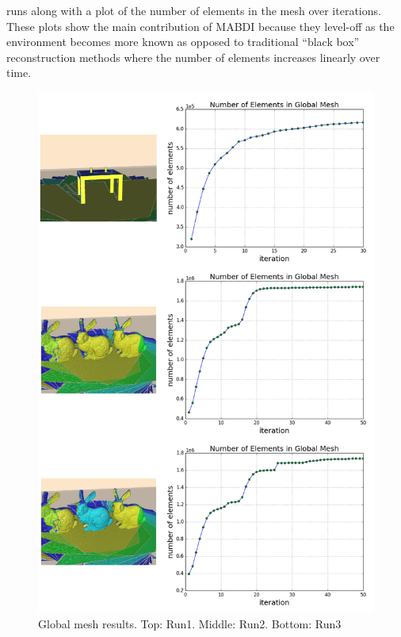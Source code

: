 runs along with a plot of the number of elements in the mesh over iterations.
These plots show the main contribution of MABDI because they level-off as the
environment becomes more known as opposed to traditional ``black box''
reconstruction methods where the number of elements increases linearly over
time.

\begin{figure}[h]%
\centering
  \includegraphics[width=\textwidth]{figures/diagram_run123_gm.png}
  \caption{Global mesh results. Top: Run1. Middle: Run2. Bottom: Run3}
  \label{fig:gm}
\end{figure}
